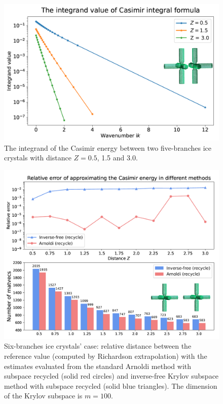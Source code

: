         \begin{figure}[H]
            \centering
            \includegraphics[scale = 1]{figures/5branches_integrand_Value.png}
            \caption{The integrand of the Casimir energy between two five-branches ice crystals with distance $Z = 0.5$, 1.5 and 3.0.}      
              \end{figure}
        
        \begin{figure}[H]
                \centering
                \includegraphics[scale = 1]{figures/6branches_rel_err.png}
                \caption{Six-branches ice crystals' case: relative distance between the reference value (computed by Richardson extrapolation) with the estimates evaluated from the standard Arnoldi 
                method with subspace recycled (solid red circles) and inverse-free Krylov subspace method with subspace recycled (solid blue triangles). The dimension of the Krylov subspace is $m = 100$.}       
             \end{figure}

